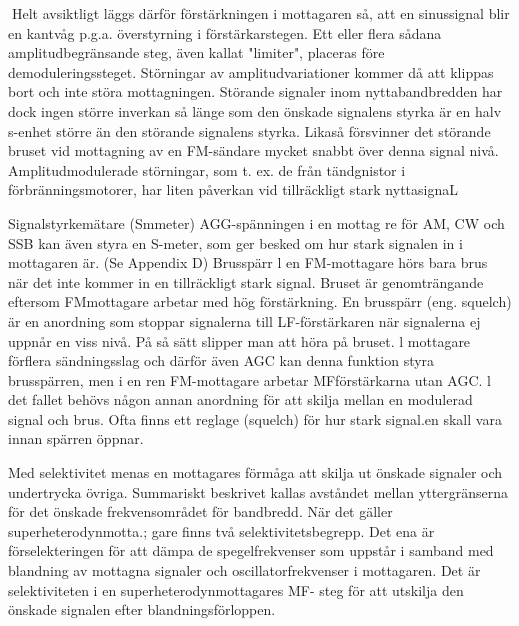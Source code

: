Helt avsiktligt läggs därför förstärkningen i
mottagaren så, att en sinussignal blir en
kantvåg p.g.a. överstyrning i förstärkarstegen. Ett eller flera sådana amplitudbegränsande steg, även kallat "limiter", placeras
före demoduleringssteget. Störningar av
amplitudvariationer kommer då att klippas
bort och inte störa mottagningen.
Störande signaler inom nyttabandbredden har dock ingen större inverkan så länge
som den önskade signalens styrka är en
halv s-enhet större än den störande signalens styrka. Likaså försvinner det störande
bruset vid mottagning av en FM-sändare
mycket snabbt över denna signal nivå. Amplitudmodulerade störningar, som t. ex. de från
tändgnistor i förbränningsmotorer, har liten
påverkan vid tillräckligt stark nyttasignaL

Signalstyrkemätare (Smmeter)
AGG-spänningen i en mottag re för AM, CW
och SSB kan även styra en S-meter, som
ger besked om hur stark signalen in i mottagaren är. (Se Appendix D)
Brusspärr
l en FM-mottagare hörs bara brus när det
inte kommer in en tillräckligt stark signal.
Bruset är genomträngande eftersom FMmottagare arbetar med hög förstärkning. En
brusspärr (eng. squelch) är en anordning
som stoppar signalerna till LF-förstärkaren
när signalerna ej uppnår en viss nivå. På så
sätt slipper man att höra på bruset. l mottagare förflera sändningsslag och därför även
AGC kan denna funktion styra brusspärren,
men i en ren FM-mottagare arbetar MFförstärkarna utan AGC. l det fallet behövs
någon annan anordning för att skilja mellan
en modulerad signal och brus. Ofta finns ett
reglage (squelch) för hur stark signal.en
skall vara innan spärren öppnar.

Med selektivitet menas en mottagares förmåga att skilja ut önskade signaler och
undertrycka övriga. Summariskt beskrivet
kallas avståndet mellan yttergränserna för
det önskade frekvensområdet för bandbredd. När det gäller superheterodynmotta.;
gare finns två selektivitetsbegrepp.
Det ena är förselekteringen för att dämpa
de spegelfrekvenser som uppstår i samband med blandning av mottagna signaler
och oscillatorfrekvenser i mottagaren.
Det är selektiviteten i en superheterodynmottagares MF- steg för att utskilja den
önskade signalen efter blandningsförloppen.

